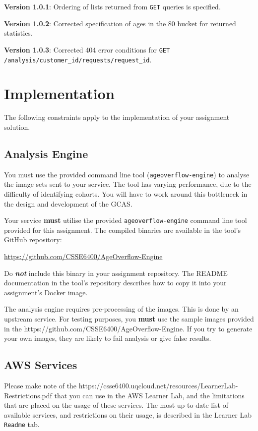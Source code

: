 \documentclass{csse4400}
\begin{document}
\textbf{Version 1.0.1}: Ordering of lists returned from \texttt{GET} queries is specified.

\textbf{Version 1.0.2}: Corrected specification of ages in the 80 bucket for returned statistics.

\textbf{Version 1.0.3}: Corrected 404 error conditions for \texttt{GET /analysis/{customer\_id}/requests/{request\_id}}.


\section{Implementation}
The following constraints apply to the implementation of your assignment solution.

\subsection{Analysis Engine}
You must use the provided command line tool (\texttt{ageoverflow-engine}) to analyse the image sets sent to your service.
The tool has varying performance, due to the difficulty of identifying cohorts.
You will have to work around this bottleneck in the design and development of the GCAS.

Your service \textbf{must} utilise the provided \texttt{ageoverflow-engine} command line tool provided for this assignment.
The compiled binaries are available in the tool's GitHub repository:

\url{https://github.com/CSSE6400/AgeOverflow-Engine}

\noindent
Do \textbf{\textit{not}} include this binary in your assignment repository.
The README documentation in the tool's repository describes how to copy it into your assignment's Docker image.


The analysis engine requires pre-processing of the images.
This is done by an upstream service.
For testing purposes, you \textbf{must} use the sample images provided in the 
{https://github.com/CSSE6400/AgeOverflow-Engine}.
If you try to generate your own images, they are likely to fail analysis or give false results.

\subsection{AWS Services}
Please make note of the 
{https://csse6400.uqcloud.net/resources/LearnerLab-Restrictions.pdf}
that you can use in the AWS Learner Lab, and the limitations that are placed on the usage of these services.
The most up-to-date list of available services, and restrictions on their usage,
is described in the Learner Lab \texttt{Readme} tab.
\end{document}
